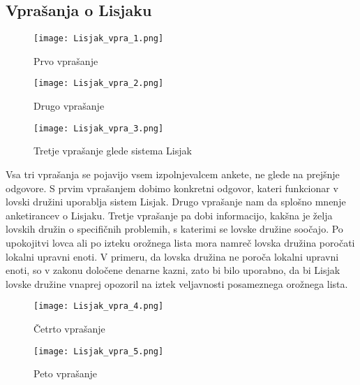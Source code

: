 \documentclass[a4paper,12pt,openright]{book}
\begin{document}
\newpage
\subsection{Vprašanja o Lisjaku}

\begin{figure}[h!]
  \centering
  \begin{minipage}[b]{0.6\textwidth}
    \centering
    \texttt{[image: Lisjak\_vpra\_1.png]}
    \caption{Prvo vprašanje}
    \label{fig:lisjak_vpra_1}
  \end{minipage}
  
  \vspace{0.5cm} %
  
  \begin{minipage}[b]{0.7\textwidth}
    \centering
    \texttt{[image: Lisjak\_vpra\_2.png]}
    \caption{Drugo vprašanje}
    \label{fig:lisjak_vpra_2}
  \end{minipage}
\end{figure}

\begin{figure}[h!]
  \centering
  \texttt{[image: Lisjak\_vpra\_3.png]}
  \caption{Tretje vprašanje glede sistema Lisjak}
  \label{fig:lisjak_vpra_3}
\end{figure}

Vsa tri vprašanja se pojavijo vsem izpolnjevalcem ankete, ne glede na prejšnje odgovore.
S prvim vprašanjem dobimo konkretni odgovor, kateri funkcionar v lovski družini uporablja sistem Lisjak.
Drugo vprašanje nam da splošno mnenje anketirancev o Lisjaku. 
Tretje vprašanje pa dobi informacijo, kakšna je želja lovskih družin o specifičnih problemih, s katerimi se lovske družine soočajo.
Po upokojitvi lovca ali po izteku orožnega lista mora namreč lovska družina poročati lokalni upravni enoti.
V primeru, da lovska družina ne poroča lokalni upravni enoti, so v zakonu določene denarne kazni, zato bi bilo uporabno, da bi Lisjak lovske družine vnaprej opozoril na iztek veljavnosti posameznega orožnega lista.


\begin{figure}[ht]
    \centering
    \texttt{[image: Lisjak\_vpra\_4.png]}
    \caption{Četrto vprašanje}
\end{figure}

\begin{figure}[ht]
    \centering
    \texttt{[image: Lisjak\_vpra\_5.png]}
    \caption{Peto vprašanje}
\end{figure}
\end{document}
